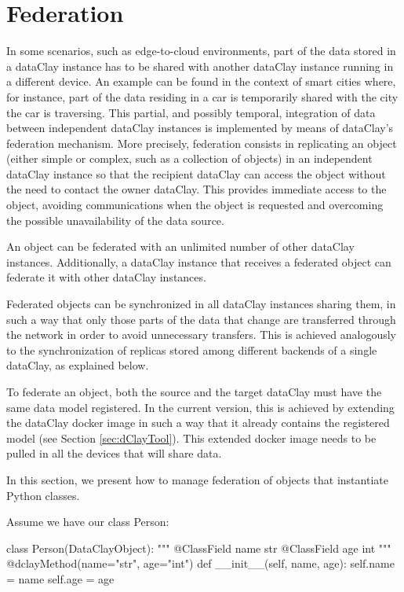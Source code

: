 \section{Federation}
\label{sec:pFederation}

In some scenarios, such as edge-to-cloud environments, part of the data stored in a dataClay instance has to be shared with another dataClay instance running in a different device. An example can be found in the context of smart cities where, for instance, part of the data residing in a car is temporarily shared with the city the car is traversing. This partial, and possibly temporal, integration of data between independent dataClay instances is implemented by means of dataClay's federation mechanism.
More precisely, federation consists in replicating an object (either simple or complex, such as a collection of objects) in an independent dataClay instance so that the recipient dataClay can access the object without the need to contact the owner dataClay. This provides immediate access to the object, avoiding communications when the object is requested and overcoming the possible unavailability of the data source. 

An object can be federated with an unlimited number of other dataClay instances. Additionally, a dataClay instance that receives a federated object can federate it with other dataClay instances.

Federated objects can be synchronized in all dataClay instances sharing them, in such a way that only those parts of the data that change are transferred through the network in order to avoid unnecessary transfers. This is achieved analogously to the synchronization of replicas stored among different backends of a single dataClay, as explained below. 

To federate an object, both the source and the target dataClay must have the same data model registered. In the current version, this is achieved by extending the dataClay docker image in such a way that it already contains the registered model (see Section \ref{sec:dClayTool}). This extended docker image needs to be pulled in all the devices that will share data.

In this section, we present how to manage federation of objects that instantiate Python classes. 

Assume we have our class Person:

\begin{tBox}
\begin{python}
class Person(DataClayObject):
     """
     @ClassField name str
     @ClassField age int
     """
    @dclayMethod(name="str", age="int")
    def __init__(self, name, age):
        self.name = name
        self.age = age
\end{python}
\end{tBox}

